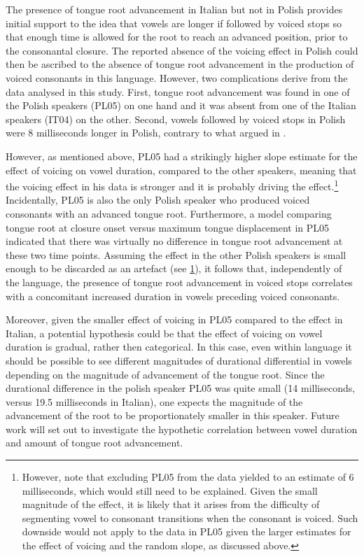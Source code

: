 \documentclass[authoryear, twocolumn]{elsarticle}
\begin{document}
The presence of tongue root advancement in Italian but not in Polish
provides initial support to the idea that vowels are longer if followed
by voiced stops so that enough time is allowed for the root to reach an
advanced position, prior to the consonantal closure. The reported
absence of the voicing effect in Polish could then be ascribed to the
absence of tongue root advancement in the production of voiced
consonants in this language. However, two complications derive from the
data analysed in this study. First, tongue root advancement was found in
one of the Polish speakers (PL05) on one hand and it was absent from one
of the Italian speakers (IT04) on the other. Second, vowels followed by
voiced stops in Polish were 8 milliseconds longer in Polish, contrary to
what argued in \citet{keating1984}.

However, as mentioned above, PL05 had a strikingly higher slope estimate
for the effect of voicing on vowel duration, compared to the other
speakers, meaning that the voicing effect in his data is stronger and it
is probably driving the
effect.\footnote{\label{fn:polish-small} However, note that excluding PL05 from the data yielded to an estimate of 6 milliseconds, which would still need to be explained. Given the small magnitude of the effect, it is likely that it arises from the difficulty of segmenting vowel to consonant transitions when the consonant is voiced. Such downside would not apply to the data in PL05 given the larger estimates for the effect of voicing and the random slope, as discussed above.}
Incidentally, PL05 is also the only Polish speaker who produced voiced
consonants with an advanced tongue root. Furthermore, a model comparing
tongue root at closure onset versus maximum tongue displacement in PL05
indicated that there was virtually no difference in tongue root
advancement at these two time points. Assuming the effect in the other
Polish speakers is small enough to be discarded as an artefact (see
\cref{fn:polish-small}), it follows that, independently of the language,
the presence of tongue root advancement in voiced stops correlates with
a concomitant increased duration in vowels preceding voiced consonants.

Moreover, given the smaller effect of voicing in PL05 compared to the
effect in Italian, a potential hypothesis could be that the effect of
voicing on vowel duration is gradual, rather then categorical. In this
case, even within language it should be possible to see different
magnitudes of durational differential in vowels depending on the
magnitude of advancement of the tongue root. Since the durational
difference in the polish speaker PL05 was quite small (14 milliseconds,
versus 19.5 milliseconds in Italian), one expects the magnitude of the
advancement of the root to be proportionately smaller in this speaker.
Future work will set out to investigate the hypothetic correlation
between vowel duration and amount of tongue root advancement.
\end{document}
